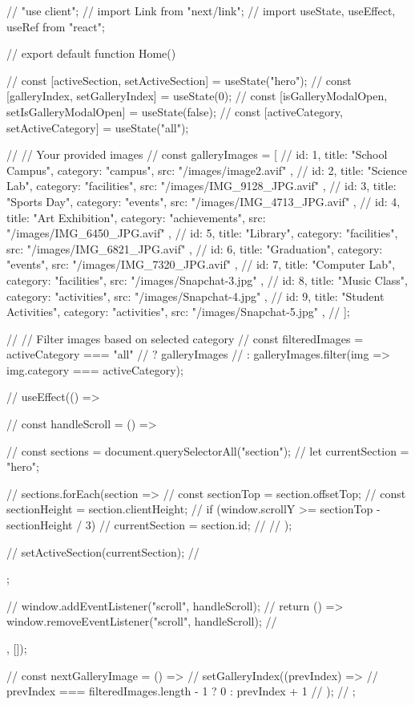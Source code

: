 // "use client";
// import Link from "next/link";
// import { useState, useEffect, useRef } from "react";

// export default function Home() {
//   const [activeSection, setActiveSection] = useState("hero");
//   const [galleryIndex, setGalleryIndex] = useState(0);
//   const [isGalleryModalOpen, setIsGalleryModalOpen] = useState(false);
//   const [activeCategory, setActiveCategory] = useState("all");

//   // Your provided images
//   const galleryImages = [
//     { id: 1, title: "School Campus", category: "campus", src: "/images/image2.avif" },
//     { id: 2, title: "Science Lab", category: "facilities", src: "/images/IMG_9128_JPG.avif" },
//     { id: 3, title: "Sports Day", category: "events", src: "/images/IMG_4713_JPG.avif" },
//     { id: 4, title: "Art Exhibition", category: "achievements", src: "/images/IMG_6450_JPG.avif" },
//     { id: 5, title: "Library", category: "facilities", src: "/images/IMG_6821_JPG.avif" },
//     { id: 6, title: "Graduation", category: "events", src: "/images/IMG_7320_JPG.avif" },
//     { id: 7, title: "Computer Lab", category: "facilities", src: "/images/Snapchat-3.jpg" },
//     { id: 8, title: "Music Class", category: "activities", src: "/images/Snapchat-4.jpg" },
//     { id: 9, title: "Student Activities", category: "activities", src: "/images/Snapchat-5.jpg" },
//   ];

//   // Filter images based on selected category
//   const filteredImages = activeCategory === "all" 
//     ? galleryImages 
//     : galleryImages.filter(img => img.category === activeCategory);

//   useEffect(() => {
//     const handleScroll = () => {
//       const sections = document.querySelectorAll("section");
//       let currentSection = "hero";
      
//       sections.forEach(section => {
//         const sectionTop = section.offsetTop;
//         const sectionHeight = section.clientHeight;
//         if (window.scrollY >= sectionTop - sectionHeight / 3) {
//           currentSection = section.id;
//         }
//       });
      
//       setActiveSection(currentSection);
//     };

//     window.addEventListener("scroll", handleScroll);
//     return () => window.removeEventListener("scroll", handleScroll);
//   }, []);

//   const nextGalleryImage = () => {
//     setGalleryIndex((prevIndex) => 
//       prevIndex === filteredImages.length - 1 ? 0 : prevIndex + 1
//     );
//   };

}
